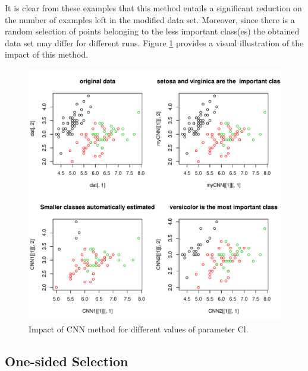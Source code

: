 \documentclass[10pt,a4paper]{article}\usepackage[]{graphicx}\usepackage[]{color}
\makeatletter
\def\maxwidth{ %
  \ifdim\Gin@nat@width>\linewidth
    \linewidth
  \else
    \Gin@nat@width
  \fi
}
\newenvironment{knitrout}{}{} %
\makeatother
\begin{document}
It is clear from these examples that this method entails a significant reduction on the number of examples left in the modified data set. Moreover, since there is a random selection of points belonging to the less important class(es) the obtained data set may differ for different runs. Figure \ref{fig:CNN_plot} provides a visual illustration of the impact of this method.

\begin{knitrout}\footnotesize
{}\color{fgcolor}\begin{figure}

{\centering \includegraphics[width=\maxwidth]{figures/UBL-CNN_plot-1} 

}

\caption[Impact of CNN method for different values of parameter Cl]{Impact of CNN method for different values of parameter Cl.}\label{fig:CNN_plot}
\end{figure}


\end{knitrout}


\subsection{One-sided Selection}\label{sec:OSS}
\end{document}
